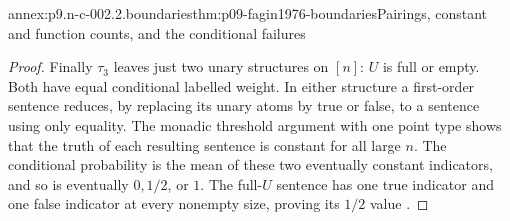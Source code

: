 \begin{annexitem}{annex:p9.n-c-002.2.boundaries}{thm:p09-fagin1976-boundaries}{Pairings, constant and function counts, and the conditional failures}
\begin{proof}
Finally \(\tau_3\) leaves just two unary structures on \([n]\):
\(U\) is full or empty.  Both have equal conditional labelled
weight.  In either structure a first-order sentence reduces, by
replacing its unary atoms by true or false, to a sentence using only
equality.  The monadic threshold argument with one point type shows
that the truth of each resulting sentence is constant for all large
\(n\).  The conditional probability is the mean of these two
eventually constant indicators, and so is eventually \(0,1/2\),
or \(1\).  The full-\(U\) sentence has one true indicator and
one false indicator at every nonempty size, proving its \(1/2\)
value \cite[sec.~4(1), (2), (5), and (6)]{Fagin1976}.
\end{proof}
\end{annexitem}
